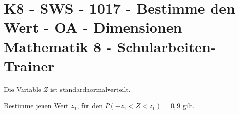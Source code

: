 \section{K8 - SWS - 1017 - Bestimme den Wert - OA - Dimensionen Mathematik 8 - Schularbeiten-Trainer}

\begin{beispiel}[K8 - SWS]{1}
Die Variable $Z$ ist standardnormalverteilt.

Bestimme jenen Wert $z_1$, für den $P(-z_1<Z<z_1)=0,9$ gilt.

\end{beispiel}